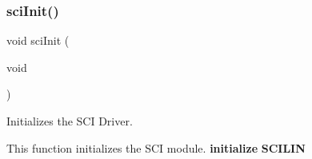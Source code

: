 \subsubsection{\texorpdfstring{sci\+Init()}{sciInit()}}
{\footnotesize\ttfamily void sci\+Init (\begin{DoxyParamCaption}\item[{void}]{ }\end{DoxyParamCaption})}



Initializes the S\+CI Driver. 

This function initializes the S\+CI module. {\bfseries initialize} {\bfseries S\+C\+I\+L\+IN} ~\newline
~\newline
~\newline
~\newline
~\newline
~\newline
~\newline
~\newline
~\newline
~\newline
~\newline
~\newline
~\newline
~\newline
~\newline

